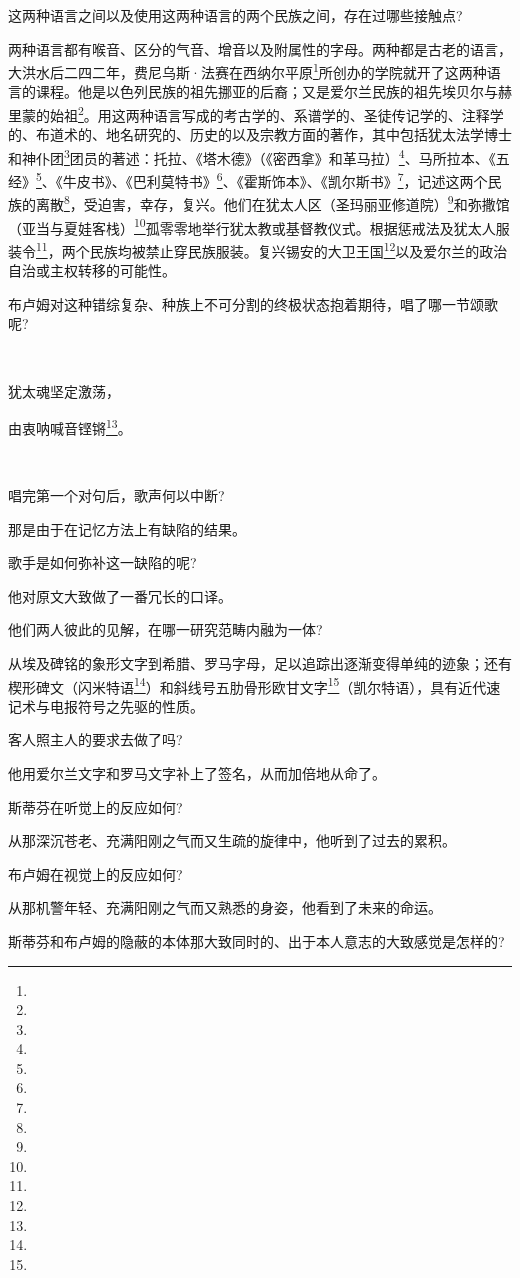 \par 这两种语言之间以及使用这两种语言的两个民族之间，存在过哪些接触点?
\par 两种语言都有喉音、区分的气音、增音以及附属性的字母。两种都是古老的语言，大洪水后二四二年，费尼乌斯·法赛在西纳尔平原\footnote{}所创办的学院就开了这两种语言的课程。他是以色列民族的祖先挪亚的后裔；又是爱尔兰民族的祖先埃贝尔与赫里蒙的始祖\footnote{}。用这两种语言写成的考古学的、系谱学的、圣徒传记学的、注释学的、布道术的、地名研究的、历史的以及宗教方面的著作，其中包括犹太法学博士和神仆团\footnote{}团员的著述：托拉、《塔木德》（《密西拿》和革马拉）\footnote{}、马所拉本、《五经》\footnote{}、《牛皮书》、《巴利莫特书》\footnote{}、《霍斯饰本》、《凯尔斯书》\footnote{}，记述这两个民族的离散\footnote{}，受迫害，幸存，复兴。他们在犹太人区（圣玛丽亚修道院）\footnote{}和弥撒馆（亚当与夏娃客栈）\footnote{}孤零零地举行犹太教或基督教仪式。根据惩戒法及犹太人服装令\footnote{}，两个民族均被禁止穿民族服装。复兴锡安的大卫王国\footnote{}以及爱尔兰的政治自治或主权转移的可能性。
\par 布卢姆对这种错综复杂、种族上不可分割的终极状态抱着期待，唱了哪一节颂歌呢?
\par  
\par 犹太魂坚定激荡，
\par 由衷呐喊音铿锵\footnote{}。
\par  
\par 唱完第一个对句后，歌声何以中断?
\par 那是由于在记忆方法上有缺陷的结果。
\par 歌手是如何弥补这一缺陷的呢?
\par 他对原文大致做了一番冗长的口译。
\par 他们两人彼此的见解，在哪一研究范畴内融为一体?
\par 从埃及碑铭的象形文字到希腊、罗马字母，足以追踪出逐渐变得单纯的迹象；还有楔形碑文（闪米特语\footnote{}）和斜线号五肋骨形欧甘文字\footnote{}（凯尔特语），具有近代速记术与电报符号之先驱的性质。
\par 客人照主人的要求去做了吗?
\par 他用爱尔兰文字和罗马文字补上了签名，从而加倍地从命了。
\par 斯蒂芬在听觉上的反应如何?
\par 从那深沉苍老、充满阳刚之气而又生疏的旋律中，他听到了过去的累积。
\par 布卢姆在视觉上的反应如何?
\par 从那机警年轻、充满阳刚之气而又熟悉的身姿，他看到了未来的命运。
\par 斯蒂芬和布卢姆的隐蔽的本体那大致同时的、出于本人意志的大致感觉是怎样的?
